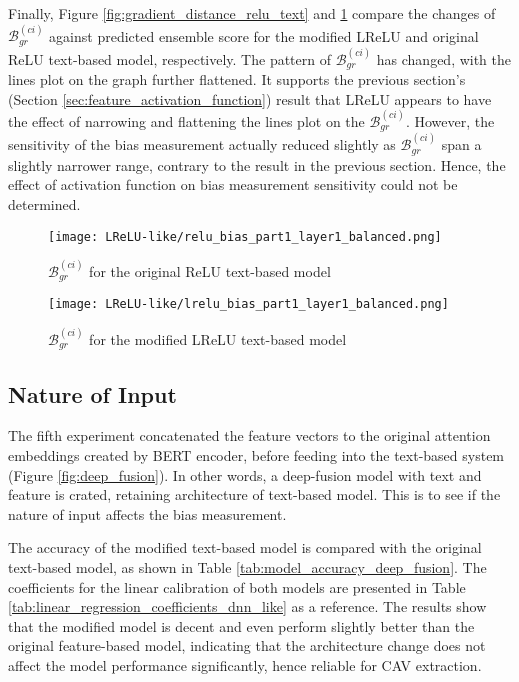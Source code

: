 Finally, Figure \ref{fig:gradient_distance_relu_text} and \ref{fig:gradient_distance_lrelu_text} compare the changes of $\mathcal{B}^{(ci)}_{gr}$ against predicted ensemble score for the modified LReLU and original ReLU text-based model, respectively. The pattern of $\mathcal{B}^{(ci)}_{gr}$ has changed, with the lines plot on the graph further flattened. It supports the previous section's (Section \ref{sec:feature_activation_function}) result that LReLU appears to have the effect of narrowing and flattening the lines plot on the $\mathcal{B}^{(ci)}_{gr}$. However, the sensitivity of the bias measurement actually reduced slightly as $\mathcal{B}^{(ci)}_{gr}$ span a slightly narrower range, contrary to the result in the previous section. Hence, the effect of activation function on bias measurement sensitivity could not be determined.

\begin{figure}[H]
    \centering
    \begin{minipage}[t]{0.48\textwidth}
        \centering
        \texttt{[image: LReLU-like/relu\_bias\_part1\_layer1\_balanced.png]}
        \caption{$\mathcal{B}^{(ci)}_{gr}$ for the original ReLU text-based model}
        \label{fig:gradient_distance_relu_text}
    \end{minipage}
    \hfill
    \begin{minipage}[t]{0.48\textwidth}
        \centering
        \texttt{[image: LReLU-like/lrelu\_bias\_part1\_layer1\_balanced.png]}
        \caption{$\mathcal{B}^{(ci)}_{gr}$ for the modified LReLU text-based model}
        \label{fig:gradient_distance_lrelu_text}
    \end{minipage}
\end{figure}

\subsection{Nature of Input}
The fifth experiment concatenated the feature vectors to the original attention embeddings created by BERT encoder, before feeding into the text-based system (Figure \ref{fig:deep_fusion}). In other words, a deep-fusion model with text and feature is crated, retaining architecture of text-based model. This is to see if the nature of input affects the bias measurement.

The accuracy of the modified text-based model is compared with the original text-based model, as shown in Table \ref{tab:model_accuracy_deep_fusion}. The coefficients for the linear calibration of both models are presented in Table \ref{tab:linear_regression_coefficients_dnn_like} as a reference. The results show that the modified model is decent and even perform slightly better than the original feature-based model, indicating that the architecture change does not affect the model performance significantly, hence reliable for CAV extraction.

